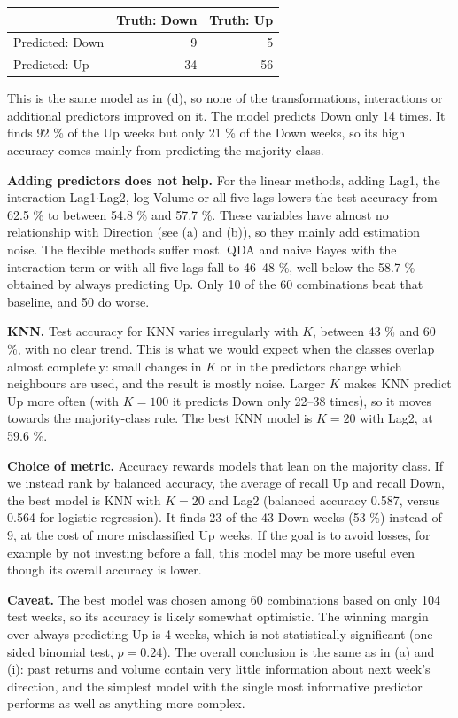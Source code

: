\documentclass[11pt]{article}
\begin{document}
\begin{center}
\begin{tabular}{lrr}
\toprule
& Truth: Down & Truth: Up \\
\midrule
Predicted: Down & 9 & 5 \\
Predicted: Up & 34 & 56 \\
\bottomrule
\end{tabular}
\end{center}

This is the same model as in (d), so none of the transformations, interactions or additional predictors improved on it. The model predicts Down only 14 times. It finds 92 \% of the Up weeks but only 21 \% of the Down weeks, so its high accuracy comes mainly from predicting the majority class.

\textbf{Adding predictors does not help.} For the linear methods, adding Lag1, the interaction Lag1$\cdot$Lag2, log Volume or all five lags lowers the test accuracy from 62.5 \% to between 54.8 \% and 57.7 \%. These variables have almost no relationship with Direction (see (a) and (b)), so they mainly add estimation noise. The flexible methods suffer most. QDA and naive Bayes with the interaction term or with all five lags fall to 46--48 \%, well below the 58.7 \% obtained by always predicting Up. Only 10 of the 60 combinations beat that baseline, and 50 do worse.

\textbf{KNN.} Test accuracy for KNN varies irregularly with \(K\), between 43 \% and 60 \%, with no clear trend. This is what we would expect when the classes overlap almost completely: small changes in \(K\) or in the predictors change which neighbours are used, and the result is mostly noise. Larger \(K\) makes KNN predict Up more often (with \(K = 100\) it predicts Down only 22--38 times), so it moves towards the majority-class rule. The best KNN model is \(K = 20\) with Lag2, at 59.6 \%.

\textbf{Choice of metric.} Accuracy rewards models that lean on the majority class. If we instead rank by balanced accuracy, the average of recall Up and recall Down, the best model is KNN with \(K = 20\) and Lag2 (balanced accuracy 0.587, versus 0.564 for logistic regression). It finds 23 of the 43 Down weeks (53 \%) instead of 9, at the cost of more misclassified Up weeks. If the goal is to avoid losses, for example by not investing before a fall, this model may be more useful even though its overall accuracy is lower.

\textbf{Caveat.} The best model was chosen among 60 combinations based on only 104 test weeks, so its accuracy is likely somewhat optimistic. The winning margin over always predicting Up is 4 weeks, which is not statistically significant (one-sided binomial test, \(p = 0.24\)). The overall conclusion is the same as in (a) and (i): past returns and volume contain very little information about next week's direction, and the simplest model with the single most informative predictor performs as well as anything more complex.
\end{document}
